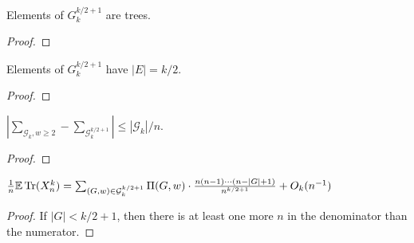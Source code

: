 \begin{lemma}
  \label{lemma:special_g_tree}
  \notready
  Elements of $G_k^{k/2+1}$ are trees.
\end{lemma}

\begin{proof}
  \notready
\end{proof}

\begin{lemma}
  \label{lemma:special_g_edge_count}
  \notready
  Elements of $G_k^{k/2+1}$ have $|E| = k/2$.
\end{lemma}

\begin{proof}
  \notready
\end{proof}

\iffalse
\begin{lemma}
  \label{lemma:special_g_vertex_count}
  \notready
  \uses{def:special_set_g, lemma:special_g_edge_count, lemma:special_set_g, prop:vertex_edge_tree_equality}
  Elements of $G_k^{k/2+1}$ have $|V| = k/2 + 1$.
\end{lemma}

\begin{proof}
  \notready
  Follows directly from dependency graph.
\end{proof}
\fi



\begin{proposition}
  \label{prop:g_difference_bound}
  \notready
  $|\sum_{\mathcal{G}_{k}, w \ge 2} - \sum_{\mathcal{G}_k^{k/2+1}}| \le |\mathcal{G}_k|/n$.
\end{proposition}

\begin{proof}
  \notready
\end{proof}



\begin{proposition}%
  \label{prop:trace_ev_special_g}
  \notready
  $\frac1n\mathbb{E}\operatorname{Tr}(X_n^k) = \sum_{(G,w)\in\mathcal{G}^{k/2+1}_k} \Pi(G,w) \cdot \frac{n(n-1)\cdots(n-|G|+1)}{n^{k/2+1}} + O_k(n^{-1})$
\end{proposition}

\begin{proof}
  \notready
  If $|G| < k/2 + 1$, then there is at least one more $n$ in the denominator than the numerator.
\end{proof}

